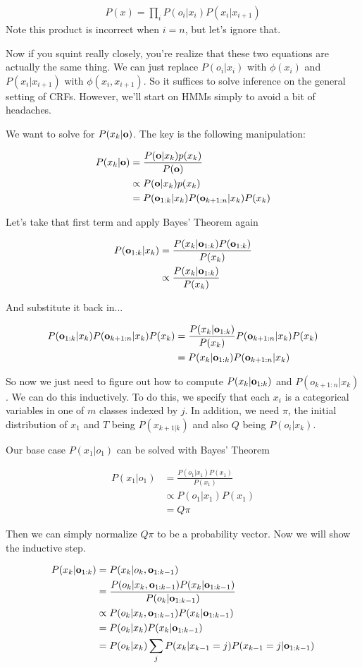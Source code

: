 \documentclass[12pt]{article}
\newcommand{\eq}[1]{\begin{align*}#1\end{align*}}
\begin{document}
\eq{
P(x) = \prod_i P(o_i | x_i) P(x_i | x_{i+1})
}
Note this product is incorrect when $i = n$, but let's ignore that.

Now if you squint really closely, you're realize that these two equations are actually the same thing. We can just replace $P(o_i|x_i)$ with $\phi(x_i)$ and $P(x_i|x_{i+1})$ with $\phi(x_i, x_{i+1})$. So it suffices to solve inference on the general setting of CRFs. However, we'll start on HMMs simply to avoid a bit of headaches.

We want to solve for $P(x_k|\mathbf{o})$. The key is the following manipulation:

\eq{
  P(x_k|\o) &= \frac{P(\o|x_k)p(x_k)}{P(\o)} \\
  &\propto P(\o|x_k)p(x_k) \\
  &= P(\o_{1:k}|x_k)P(\o_{k+1:n}|x_k)P(x_k) \\
}

Let's take that first term and apply Bayes' Theorem again

\eq{
  P(\o_{1:k}|x_k) &= \frac{P(x_k | \o_{1:k}) P(\o_{1:k})}{P(x_k)} \\
  &\propto \frac{P(x_k | \o_{1:k})}{P(x_k)}
}

And substitute it back in...

\eq{
  P(\o_{1:k}|x_k)P(\o_{k+1:n}|x_k)P(x_k) &= \frac{P(x_k|\o_{1:k})}{P(x_k)}P(\o_{k+1:n}|x_k)P(x_k) \\
  &= P(x_k|\o_{1:k})P(\o_{k+1:n}|x_k)
}

So now we just need to figure out how to compute $P(x_k|\mathbf{o}_{1:k})$ and $P(o_{k+1:n}|x_k)$. We can do this inductively. To do this, we specify that each $x_i$ is a categorical variables in one of $m$ classes indexed by $j$. In addition, we need $\pi$, the initial distribution of $x_1$ and $T$ being $P(x_{k+1|k})$ and also $Q$ being $P(o_i|x_k)$. 

Our base case $P(x_1|o_1)$ can be solved with Bayes' Theorem

\eq{
  P(x_1|o_1) &= \frac{P(o_1|x_1)P(x_1)}{P(x_1)} \\
  &\propto P(o_1|x_1)P(x_1) \\
  &= Q\pi
}

Then we can simply normalize $Q\pi$ to be a probability vector. Now we will show the inductive step.

\eq{
  P(x_k|\o_{1:k}) &= P(x_k|o_k,\o_{1:k-1}) \\
  &= \frac{P(o_k|x_k,\o_{1:k-1})P(x_k|\o_{1:k-1})}{P(o_k|\o_{1:k-1})} \\
  &\propto P(o_k|x_k,\o_{1:k-1})P(x_k|\o_{1:k-1}) \\
  &= P(o_k|x_k)P(x_k|\o_{1:k-1}) \\
  &= P(o_k|x_k) \sum_j P(x_k|x_{k-1} = j)P(x_{k-1}=j|\o_{1:k-1}) \\
}
\end{document}
